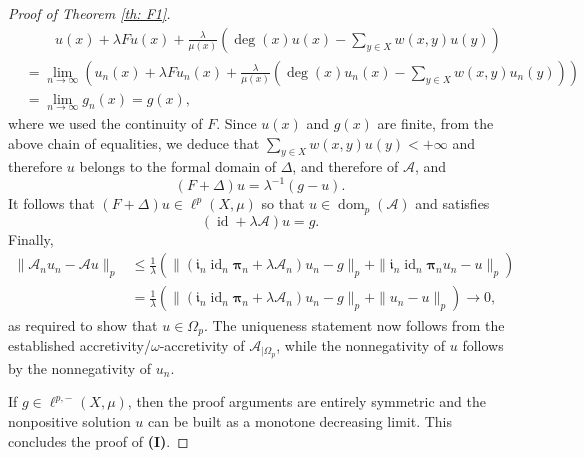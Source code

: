 \documentclass[journal]{article}
\theoremstyle{nonitalic}
\theoremstyle{nonitalic}
\theoremstyle{plain} %
\numberwithin{equation}{section}
\newcommand{\dom}{\operatorname{dom}}
\begin{document}
\begin{proof}[Proof of Theorem \ref{th: F1}]
$$\begin{aligned}
&\phantom{\,\,=\,\,\,}u(x)+\lambda Fu(x)+\frac{\lambda}{\mu(x)} \left( \deg(x)u(x)-\sum_{y\in X} w(x,y)u(y) \right)\\&=
\lim_{n\to \infty} \left( u_n(x)+\lambda Fu_n(x)+\frac{\lambda}{\mu(x)}\left( \deg(x)u_n(x) - \sum_{y\in X}w(x,y)u_n(y) \right) \right)\\
&=\lim_{n\to \infty}  g_n (x)= g(x),
\end{aligned}
$$
where we used the continuity of $F$.
Since $u(x)$ and $g(x)$ are finite, from the above chain of equalities, we deduce   that 
$
\sum_{y\in X} w(x,y)u(y) <+\infty
$ 
and therefore $u$ belongs to the formal domain of $\Delta$,  and therefore of $\mathcal{A}$, and 
\[
(F + \Delta) u = \lambda^{-1}(g- u).
\]
It follows that $(F+\Delta) u\in \ell^p(X,\mu)$ so that $u\in \dom_p(\mathcal{A})$ and satisfies 
\[
(\operatorname{id} + \lambda \mathcal{A})u=g.
\]
Finally, 
\begin{align}\label{eq:thm_existence_Alb}
 	\|\mathcal A_n u_n - \mathcal{A}u\|_p & \leq \frac{1}{\lambda} \left( \|(\boldsymbol{\mathfrak{i}}_{n}\operatorname{id}_n\boldsymbol{\pi}_n + \lambda\mathcal A_n)u_n - g\|_p +  \| \boldsymbol{\mathfrak{i}}_{n}\operatorname{id}_n\boldsymbol{\pi}_n u_n - u \|_p \right) \nonumber \\
 	&= \frac{1}{\lambda} \left( \|(\boldsymbol{\mathfrak{i}}_{n}\operatorname{id}_n\boldsymbol{\pi}_n + \lambda\mathcal A_n)u_n - g\|_p +  \|  u_n - u \|_p \right)\to 0,
 \end{align}
as required to show that $u\in \Omega_p$. The uniqueness statement now follows from the established accretivity/$\omega$-accretivity of $\mathcal{A}_{|\Omega_p}$, while the nonnegativity of $u$ follows by the nonnegativity of $u_n$.


 If $g\in \ell^{p,-}(X,\mu)$, then the proof arguments are entirely symmetric and the nonpositive solution $u$ can be built as a monotone decreasing limit. This concludes the proof of \textnormal{\textbf{(I)}}.


\end{proof}
\end{document}
